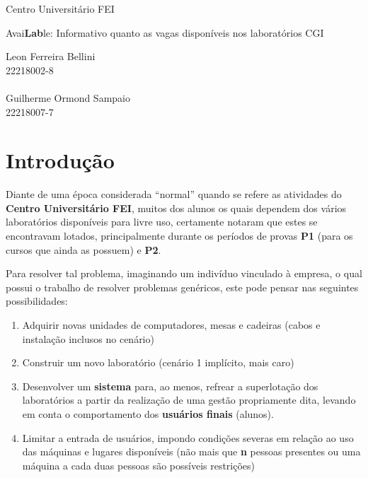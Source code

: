 \documentclass[11pt, a4paper]{article}
\author{Leon Ferreira Bellini}
\date{\today}
\title{}
\begin{document}
\begin{titlepage}
\begin{center}
Centro Universitário FEI
\end{center}
\vspace*{\fill}
\begin{center}
  \huge{Avai\textbf{Lab}le: Informativo quanto as vagas disponíveis nos laboratórios CGI}
\end{center}
\vspace*{\fill}
  \Large{Leon Ferreira Bellini} \\
  \small{22218002-8} \\\\
  \Large{Guilherme Ormond Sampaio} \\
  \small{22218007-7}
\end{titlepage}

\tableofcontents

\clearpage

\section{Introdução}
\label{sec:org42fe0eb}
Diante de uma época considerada ``normal'' quando se refere as atividades do
\textbf{Centro Universitário FEI}, muitos dos alunos os quais dependem dos vários
laboratórios disponíveis para livre uso, certamente notaram que estes
se encontravam 
lotados, principalmente durante os períodos de provas \textbf{P1}
(para os cursos que ainda as possuem) e \textbf{P2}.

Para resolver tal problema, imaginando um indivíduo vinculado à empresa,
o qual possui o trabalho de resolver problemas genéricos, este pode
pensar nas seguintes possibilidades:

\begin{enumerate}
\item Adquirir novas unidades de computadores, mesas e cadeiras
(cabos e instalação inclusos no cenário)
\item Construir um novo laboratório (cenário 1 implícito, mais caro)
\item Desenvolver um \textbf{sistema} para, ao menos, refrear a superlotação dos laboratórios
a partir da realização de uma gestão propriamente dita, levando em conta
o comportamento dos \textbf{usuários finais} (alunos).
\item Limitar a entrada de usuários, impondo condições severas em relação ao
uso das máquinas e lugares disponíveis 
(não mais que \textbf{n} pessoas presentes ou uma máquina a cada duas pessoas são possíveis restrições)
\end{enumerate}
\end{document}
